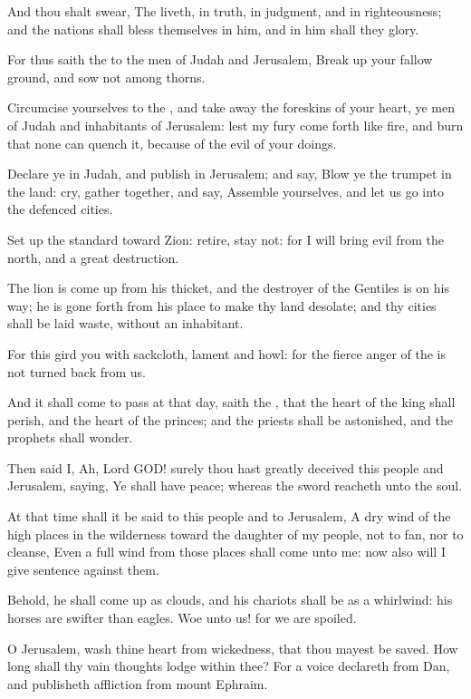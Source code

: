 \verse And thou shalt swear, The \LORD liveth, in truth, in judgment, and in righteousness; and the nations shall bless themselves in him, and in him shall they glory.

\verse For thus saith the \LORD to the men of Judah and Jerusalem, Break up your fallow ground, and sow not among thorns.

\verse Circumcise yourselves to the \LORD, and take away the foreskins of your heart, ye men of Judah and inhabitants of Jerusalem: lest my fury come forth like fire, and burn that none can quench it, because of the evil of your doings.

\verse Declare ye in Judah, and publish in Jerusalem; and say, Blow ye the trumpet in the land: cry, gather together, and say, Assemble yourselves, and let us go into the defenced cities.

\verse Set up the standard toward Zion: retire, stay not: for I will bring evil from the north, and a great destruction.

\verse The lion is come up from his thicket, and the destroyer of the Gentiles is on his way; he is gone forth from his place to make thy land desolate; and thy cities shall be laid waste, without an inhabitant.

\verse For this gird you with sackcloth, lament and howl: for the fierce anger of the \LORD is not turned back from us.

\verse And it shall come to pass at that day, saith the \LORD, that the heart of the king shall perish, and the heart of the princes; and the priests shall be astonished, and the prophets shall wonder.

\verse Then said I, Ah, Lord GOD! surely thou hast greatly deceived this people and Jerusalem, saying, Ye shall have peace; whereas the sword reacheth unto the soul.

\verse At that time shall it be said to this people and to Jerusalem, A dry wind of the high places in the wilderness toward the daughter of my people, not to fan, nor to cleanse, \verse Even a full wind from those places shall come unto me: now also will I give sentence against them.

\verse Behold, he shall come up as clouds, and his chariots shall be as a whirlwind: his horses are swifter than eagles. Woe unto us! for we are spoiled.

\verse O Jerusalem, wash thine heart from wickedness, that thou mayest be saved. How long shall thy vain thoughts lodge within thee?  \verse For a voice declareth from Dan, and publisheth affliction from mount Ephraim.


